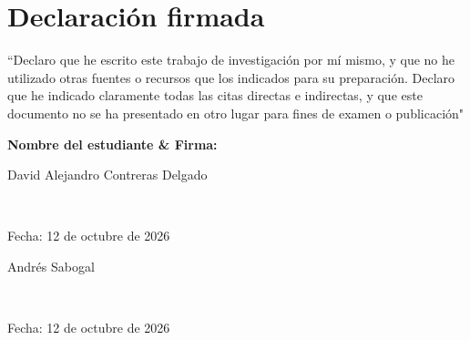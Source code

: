 \newcommand*\wildcard[2][6cm]{\vspace{2cm}\parbox{#1}{\hrulefill\par#2}} 

\section*{Declaración firmada}

\vspace{1cm}

“Declaro que he escrito este trabajo de investigación por mí mismo, y que no he utilizado otras fuentes o recursos que los indicados para su preparación. Declaro que he indicado claramente todas las citas directas e indirectas, y que este documento no se ha presentado en otro lugar para fines de examen o publicación"

\vspace{3cm}
\textbf{Nombre del estudiante \& Firma:}
\vspace{1cm}

\begingroup

    \begin{center}
        \wildcard{\centerline{David Alejandro Contreras Delgado} ~\\ \centerline{Fecha: 12 de octubre de 2026}}
        \hspace{2cm} %
        \wildcard{\centerline{Andrés Sabogal} ~\\ \centerline{Fecha: 12 de octubre de 2026} }
    \end{center}

\endgroup


\pagebreak